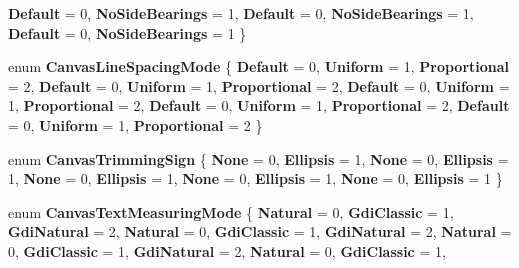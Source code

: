 \begin{DoxyCompactItemize}
{\bfseries Default} = 0, 
{\bfseries No\+Side\+Bearings} = 1, 
{\bfseries Default} = 0, 
{\bfseries No\+Side\+Bearings} = 1, 
\newline
{\bfseries Default} = 0, 
{\bfseries No\+Side\+Bearings} = 1
 \}
\item 
\mbox{\label{namespace_microsoft_1_1_graphics_1_1_canvas_1_1_text_a0af1601f34ce8114935e99af136dc8cc}} 
enum {\bfseries Canvas\+Line\+Spacing\+Mode} \{ \newline
{\bfseries Default} = 0, 
{\bfseries Uniform} = 1, 
{\bfseries Proportional} = 2, 
{\bfseries Default} = 0, 
\newline
{\bfseries Uniform} = 1, 
{\bfseries Proportional} = 2, 
{\bfseries Default} = 0, 
{\bfseries Uniform} = 1, 
\newline
{\bfseries Proportional} = 2, 
{\bfseries Default} = 0, 
{\bfseries Uniform} = 1, 
{\bfseries Proportional} = 2, 
\newline
{\bfseries Default} = 0, 
{\bfseries Uniform} = 1, 
{\bfseries Proportional} = 2
 \}
\item 
\mbox{\label{namespace_microsoft_1_1_graphics_1_1_canvas_1_1_text_a891e2d3429f4e8717d79bdd171ed64a0}} 
enum {\bfseries Canvas\+Trimming\+Sign} \{ \newline
{\bfseries None} = 0, 
{\bfseries Ellipsis} = 1, 
{\bfseries None} = 0, 
{\bfseries Ellipsis} = 1, 
\newline
{\bfseries None} = 0, 
{\bfseries Ellipsis} = 1, 
{\bfseries None} = 0, 
{\bfseries Ellipsis} = 1, 
\newline
{\bfseries None} = 0, 
{\bfseries Ellipsis} = 1
 \}
\item 
\mbox{\label{namespace_microsoft_1_1_graphics_1_1_canvas_1_1_text_a3496181b6d55fc9dc4eeaff916dc841f}} 
enum {\bfseries Canvas\+Text\+Measuring\+Mode} \{ \newline
{\bfseries Natural} = 0, 
{\bfseries Gdi\+Classic} = 1, 
{\bfseries Gdi\+Natural} = 2, 
{\bfseries Natural} = 0, 
\newline
{\bfseries Gdi\+Classic} = 1, 
{\bfseries Gdi\+Natural} = 2, 
{\bfseries Natural} = 0, 
{\bfseries Gdi\+Classic} = 1, 
\newline
{\bfseries Gdi\+Natural} = 2, 
{\bfseries Natural} = 0, 
{\bfseries Gdi\+Classic} = 1, 

\end{DoxyCompactItemize}
